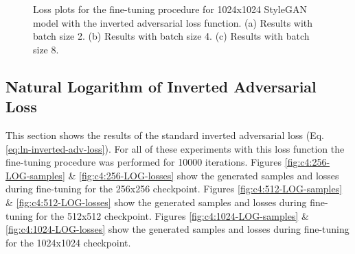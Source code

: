   \begin{figure}[!htbp]
    \centering
    \hfill
    \hfill
    \caption[Loss plots for the fine-tuning procedure for 1024x1024 StyleGAN model with the inverted adversarial loss function]{Loss plots for the fine-tuning procedure for 1024x1024 StyleGAN model with the inverted adversarial loss function. (a) Results with batch size 2. (b) Results with batch size 4. (c) Results with batch size 8.}
    \label{fig:c4:1024-OG-losses}
  \end{figure}

\FloatBarrier

\subsection{Natural Logarithm of Inverted Adversarial Loss}
\label{c4:sec:log-loss}

This section shows the results of the standard inverted adversarial loss (Eq. \ref{eq:ln-inverted-adv-loss}). For all of these experiments with this loss function the fine-tuning procedure was performed for 10000 iterations.
Figures \ref{fig:c4:256-LOG-samples} \& \ref{fig:c4:256-LOG-losses} show the generated samples and losses during fine-tuning for the 256x256 checkpoint.
Figures \ref{fig:c4:512-LOG-samples} \& \ref{fig:c4:512-LOG-losses} show the generated samples and losses during fine-tuning for the 512x512 checkpoint.
Figures \ref{fig:c4:1024-LOG-samples} \& \ref{fig:c4:1024-LOG-losses} show the generated samples and losses during fine-tuning for the 1024x1024 checkpoint.

